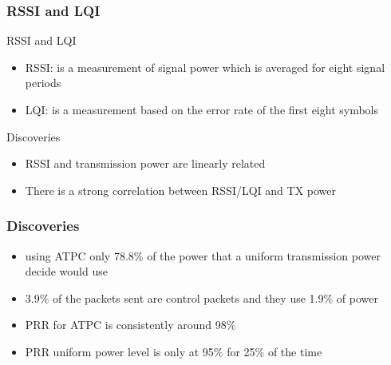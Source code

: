 \begin{frame}[t]
  \frametitle{RSSI and LQI}

  RSSI and LQI
  \begin{itemize}
  \item RSSI: is a measurement of signal power which is averaged for eight signal periods
  \item LQI: is a measurement based on the error rate of the first eight symbols
  \end{itemize}

  \vfill

  Discoveries
  \begin{itemize}
  \item RSSI and transmission power are linearly related
  \item There is a strong correlation between RSSI/LQI and TX power
  \end{itemize}

  \vfill

  \begin{flushleft}
    \begin{tiny}
      \begin{minipage}{1.0\linewidth}
      \end{minipage}
    \end{tiny}
  \end{flushleft}

\end{frame}    

\begin{frame}[t]
  \frametitle{Discoveries}

  \begin{itemize}
  \item using ATPC only 78.8\% of the power that a uniform transmission power decide would use
  \item 3.9\% of the packets sent are control packets and they use 1.9\% of power
  \item PRR for ATPC is consistently around 98\%
  \item PRR uniform power level is only at 95\% for 25\% of the time
  \end{itemize}
    
  \vfill
  
  \begin{flushleft}
    \begin{tiny}
      \begin{minipage}{1.0\linewidth}
      \end{minipage}
    \end{tiny}
  \end{flushleft}

\end{frame}
